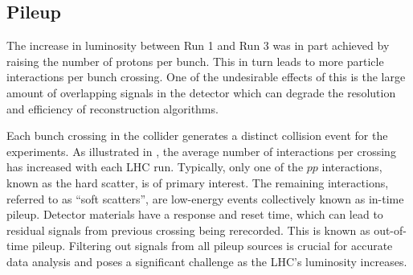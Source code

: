 \begin{table}[h!]
    \centering
    \caption{Overview of the different LHC runs~\cite{LHCRun2,LHCRun3,run1data, run2data, run3data}. Values for Run 3 are preliminary as data is still being collected.}
    \label{tab:lhc_runs}
\end{table}

\subsection{Pileup}

The increase in luminosity between Run 1 and Run 3 was in part achieved by raising the number of protons per bunch.
This in turn leads to more particle interactions per bunch crossing.
One of the undesirable effects of this is the large amount of overlapping signals in the detector which can degrade the resolution and efficiency of reconstruction algorithms.

Each bunch crossing in the collider generates a distinct collision event for the experiments.
As illustrated in , the average number of interactions per crossing has increased with each LHC run.
Typically, only one of the $pp$ interactions, known as the hard scatter, is of primary interest.
The remaining interactions, referred to as ``soft scatters'', are low-energy events collectively known as in-time pileup.
Detector materials have a response and reset time, which can lead to residual signals from previous crossing being rerecorded.
This is known as out-of-time pileup.
Filtering out signals from all pileup sources is crucial for accurate data analysis and poses a significant challenge as the LHC's luminosity increases.

